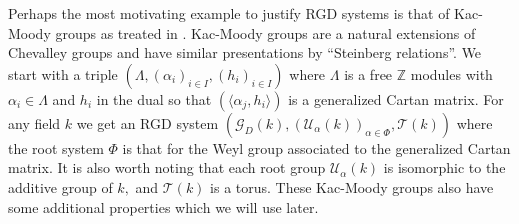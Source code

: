 \documentclass[class=book, crop=false,12 pt]{standalone}
\begin{document}
Perhaps the most motivating example to justify RGD systems is that of Kac-Moody groups as treated in \cite{kacmoody}. Kac-Moody groups are a natural extensions of Chevalley groups and have similar presentations by ``Steinberg relations''. We start with a triple $(\Lambda,(\alpha_i)_{i\in I},(h_i)_{i\in I})$ where $\Lambda$ is a free $\mathbb{Z}$ modules with $\alpha_i\in \Lambda$ and $h_i$ in the dual so that $(\langle \alpha_j,h_i\rangle)$ is a generalized Cartan matrix. For any field $k$ we get an RGD system $(\mathcal{G}_D(k),(\mathcal{U}_\alpha(k))_{\alpha\in \Phi},\mathcal{T}(k))$ where the root system $\Phi$ is that for the Weyl group associated to the generalized Cartan matrix. It is also worth noting that each root group $\mathcal{U}_\alpha(k)$ is isomorphic to the additive group of $k,$ and $\mathcal{T}(k)$ is a torus. These Kac-Moody groups also have some additional properties which we will use later.
\end{document}
